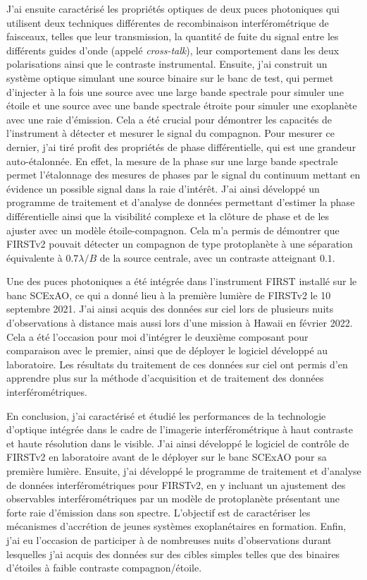 J'ai ensuite caractérisé les propriétés optiques de deux puces photoniques qui utilisent deux techniques différentes de recombinaison interférométrique de faisceaux, telles que leur transmission, la quantité de fuite du signal entre les différents guides d'onde (appelé \textit{cross-talk}), leur comportement dans les deux polarisations ainsi que le contraste instrumental. Ensuite, j'ai construit un système optique simulant une source binaire sur le banc de test, qui permet d'injecter à la fois une source avec une large bande spectrale pour simuler une étoile et une source avec une bande spectrale étroite pour simuler une exoplanète avec une raie d'émission. Cela a été crucial pour démontrer les capacités de l'instrument à détecter et mesurer le signal du compagnon. Pour mesurer ce dernier, j'ai tiré profit des propriétés de phase différentielle, qui est une grandeur auto-étalonnée. En effet, la mesure de la phase sur une large bande spectrale permet l'étalonnage des mesures de phases par le signal du continuum mettant en évidence un possible signal dans la raie d'intérêt. J'ai ainsi développé un programme de traitement et d'analyse de données permettant d'estimer la phase différentielle ainsi que la visibilité complexe et la clôture de phase et de les ajuster avec un modèle étoile-compagnon. Cela m'a permis de démontrer que FIRSTv2 pouvait détecter un compagnon de type protoplanète à une séparation équivalente à $0.7 \lambda / B$ de la source centrale, avec un contraste atteignant $0.1$.

Une des puces photoniques a été intégrée dans l'instrument FIRST installé sur le banc SCExAO, ce qui a donné lieu à la première lumière de FIRSTv2 le 10 septembre 2021. J'ai ainsi acquis des données sur ciel lors de plusieurs nuits d'observations à distance mais aussi lors d'une mission à Hawaii en février 2022. Cela a été l'occasion pour moi d'intégrer le deuxième composant pour comparaison avec le premier, ainsi que de déployer le logiciel développé au laboratoire. Les résultats du traitement de ces données sur ciel ont permis d'en apprendre plus sur la méthode d'acquisition et de traitement des données interférométriques.

En conclusion, j'ai caractérisé et étudié les performances de la technologie d'optique intégrée dans le cadre de l'imagerie interférométrique à haut contraste et haute résolution dans le visible. J'ai ainsi développé le logiciel de contrôle de FIRSTv2 en laboratoire avant de le déployer sur le banc SCExAO pour sa première lumière. Ensuite, j'ai développé le programme de traitement et d'analyse de données interférométriques pour FIRSTv2, en y incluant un ajustement des observables interférométriques par un modèle de protoplanète présentant une forte raie d'émission dans son spectre. L'objectif est de caractériser les mécanismes d'accrétion de jeunes systèmes exoplanétaires en formation. Enfin, j'ai eu l'occasion de participer à de nombreuses nuits d'observations durant lesquelles j'ai acquis des données sur des cibles simples telles que des binaires d'étoiles à faible contraste compagnon/étoile.


